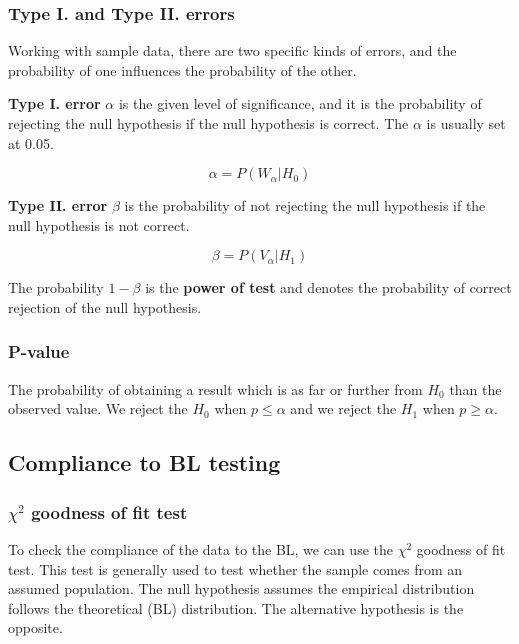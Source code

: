 \subsubsection*{Type I. and Type II. errors}

Working with sample data, there are two specific kinds of errors, and the probability of one influences the probability of the other. 

\textbf{Type I. error} $\alpha$ is the given level of significance, and it is the probability of rejecting the null hypothesis if the null hypothesis is correct. The $\alpha$ is usually set at 0.05. 

\begin{equation}
    \alpha = P(W_\alpha | H_0)
\end{equation}

\textbf{Type II. error} $\beta$ is the probability of not rejecting the null hypothesis if the null hypothesis is not correct. 

\begin{equation}
    \beta = P(V_\alpha | H_1)
\end{equation}

The probability $1-\beta$ is the \textbf{power of test} and denotes the probability of correct rejection of the null hypothesis. 

\subsubsection*{P-value}

The probability of obtaining a result which is as far or further from $H_{0}$ than the observed value. We reject the $H_{0}$ when  $p \le \alpha$ and we reject the $H_{1}$ when $p \ge \alpha$.

\subsection{Compliance to BL testing}

\subsubsection*{$\chi^2$ goodness of fit test}

To check the compliance of the data to the BL, we can use the $\chi^2$ goodness of fit test. This test is generally used to test whether the sample comes from an assumed population. The null hypothesis assumes the empirical distribution follows the theoretical (BL) distribution. The alternative hypothesis is the opposite. 


